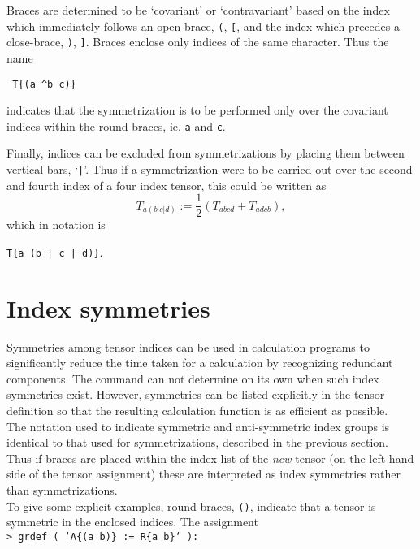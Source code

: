 \documentclass{article}
\begin{document}
Braces are determined to be `covariant' or `contravariant' based on
the index which immediately follows an open-brace, \texttt{(},
\texttt{[}, and the index which precedes a close-brace, \texttt{)},
\texttt{]}. Braces enclose only indices of the same character. Thus
the name
\begin{center}
  \texttt{ T\{(a \^{}b c)\} }
\end{center}
indicates that the symmetrization is to be performed only over the
covariant indices within the round braces, ie. \texttt{a} and \texttt{c}.

Finally, indices can be excluded from symmetrizations by
placing them between vertical bars, `\texttt{|}'. Thus if a symmetrization
were to be carried out over the second and fourth index of a four index
tensor, this could be written as
\[
  T_{a(b|c|d)} := \frac{1}{2}\left( T_{abcd} + T_{adcb} \right),
\]
which in  notation is
\begin{center}
  \texttt{T\{a (b | c | d)\}}.
\end{center}
%
\section{Index symmetries}
%
Symmetries among tensor indices can be used in calculation programs to
significantly reduce the time taken for a calculation by recognizing
redundant components. The  command can not determine on
its own when such index symmetries exist. However, symmetries can be
listed explicitly in the tensor definition so that the resulting
calculation function is as efficient as possible.\\

The notation used to indicate symmetric and anti-symmetric index
groups is identical to that used for symmetrizations, described in the
previous section. Thus if braces are placed within the index list of
the \textit{new} tensor (on the left-hand side of the tensor
assignment) these are interpreted as index symmetries rather than
symmetrizations.\\

To give some explicit examples, round braces, \texttt{()}, indicate that
a tensor is symmetric in the enclosed indices. The assignment\\

\noindent\texttt{> grdef ( `A\{(a b)\} := R\{a b\}` ):}\\
\end{document}
